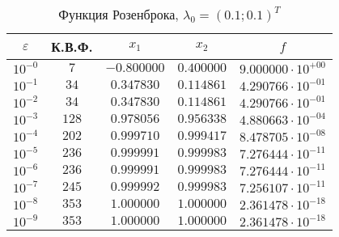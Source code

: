 \documentclass[a4paper,12pt,notitlepage,pdftex,headsepline]{scrartcl}
\begin{document}
        \begin{table}[ht]
          \centering
          \caption{Функция Розенброка, $\lambda_0 = (0.1; 0.1)^T$}
          \begin{tabular}{|c|c|c|c|c|}
            \hline
            $\varepsilon$ & К.В.Ф. & $x_1$ & $x_2$ & $f$\\
            \hline
            $10^{-0}$ & $7$ & $-0.800000$ & $0.400000$ & $9.000000\cdot 10^{+00}$\\
            $10^{-1}$ & $34$ & $0.347830$ & $0.114861$ & $4.290766\cdot 10^{-01}$\\
            $10^{-2}$ & $34$ & $0.347830$ & $0.114861$ & $4.290766\cdot 10^{-01}$\\
            $10^{-3}$ & $128$ & $0.978056$ & $0.956338$ & $4.880663\cdot 10^{-04}$\\
            $10^{-4}$ & $202$ & $0.999710$ & $0.999417$ & $8.478705\cdot 10^{-08}$\\
            $10^{-5}$ & $236$ & $0.999991$ & $0.999983$ & $7.276444\cdot 10^{-11}$\\
            $10^{-6}$ & $236$ & $0.999991$ & $0.999983$ & $7.276444\cdot 10^{-11}$\\
            $10^{-7}$ & $245$ & $0.999992$ & $0.999983$ & $7.256107\cdot 10^{-11}$\\
            $10^{-8}$ & $353$ & $1.000000$ & $1.000000$ & $2.361478\cdot 10^{-18}$\\
            $10^{-9}$ & $353$ & $1.000000$ & $1.000000$ & $2.361478\cdot 10^{-18}$\\
            \hline
          \end{tabular}
        \end{table}
\end{document}
